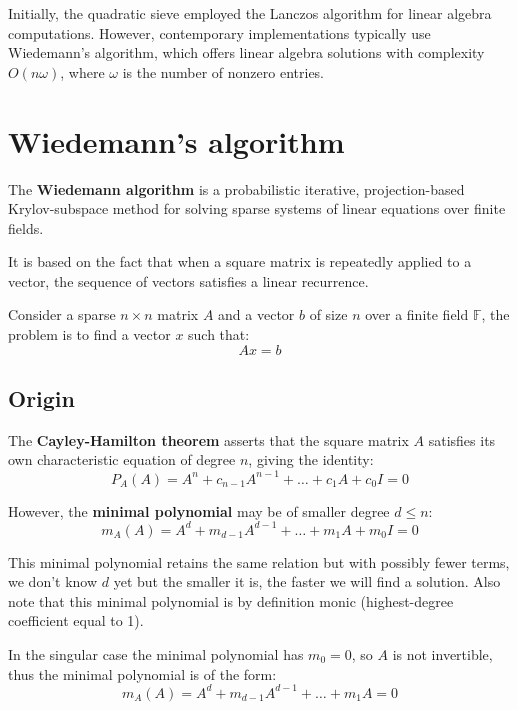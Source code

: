 \documentclass[a4paper, 11pt]{article}
\begin{document}
Initially, the quadratic sieve employed the Lanczos algorithm for linear algebra computations. However, contemporary implementations typically use Wiedemann's algorithm, which offers linear algebra solutions with complexity $O(n\omega)$, where $\omega$ is the number of nonzero entries.


\newpage

\section{Wiedemann's algorithm}
The \textbf{Wiedemann algorithm} \cite{Wiedemann1986} is a probabilistic iterative, projection-based Krylov-subspace method for solving sparse systems of linear equations over finite fields. 

It is based on the fact that when a square matrix is repeatedly applied to a vector, the sequence of vectors satisfies a linear recurrence.

Consider a sparse $n \times n$ matrix $A$ and a vector $b$ of size $n$ over a finite field $\mathbb{F}$, the problem is to find a vector $x$ such that:
\begin{equation}
    Ax = b
\end{equation}

\subsection{Origin}
The \textbf{Cayley-Hamilton theorem} asserts that the square matrix $A$ satisfies its own characteristic equation of degree $n$, giving the identity:
\begin{equation}
    P_A(A) = A^n + c_{n-1}A^{n-1} + \dots + c_1A + c_0I = 0
\end{equation}

However, the \textbf{minimal polynomial} may be of smaller degree $d \leq n$:
\begin{equation}
    \label{eqn:minimal}
    m_A(A) = A^d + m_{d-1}A^{d-1} + \dots + m_1A + m_0I = 0
\end{equation}

This minimal polynomial retains the same relation but with possibly fewer terms, we don't know $d$ yet but the smaller it is, the faster we will find a solution. Also note that this minimal polynomial is by definition monic (highest-degree coefficient equal to 1).

In the singular case the minimal polynomial has $m_0=0$, so $A$ is not invertible, thus the minimal polynomial is of the form:
\begin{equation}
    m_A(A) = A^d + m_{d-1}A^{d-1} + \dots + m_1A = 0
\end{equation}
\end{document}
